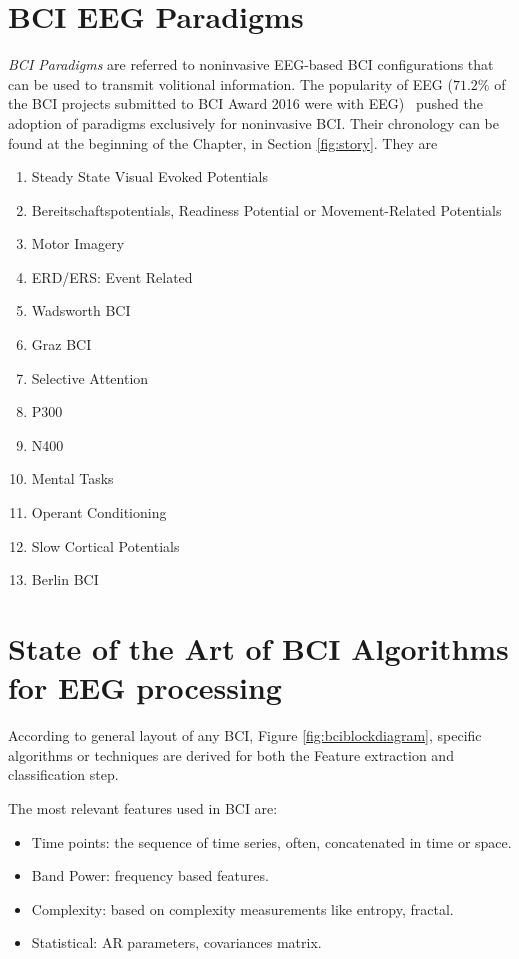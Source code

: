 \section{BCI EEG Paradigms}


\textit{BCI Paradigms} are referred to noninvasive EEG-based BCI configurations that can be used to transmit volitional information.  The popularity of EEG ($71.2\%$ of the BCI projects submitted to BCI Award 2016 were with EEG)~\cite{Guger2017} pushed the adoption of paradigms exclusively for noninvasive BCI.   Their chronology can be found at the beginning of the Chapter, in Section \ref{fig:story}. They are

\begin{enumerate}
\item Steady State Visual Evoked Potentials
\item Bereitschaftspotentials, Readiness Potential or Movement-Related Potentials
\item Motor Imagery
\item ERD/ERS: Event Related
\item Wadsworth BCI
\item Graz BCI
\item Selective Attention
\item P300
\item N400
\item Mental Tasks
\item Operant Conditioning
\item Slow Cortical Potentials
\item Berlin BCI


\end{enumerate}


\section{State of the Art of BCI Algorithms for EEG processing}

According to general layout of any BCI, Figure \ref{fig:bciblockdiagram}, specific algorithms or techniques are derived for both the Feature extraction and classification step.

The most relevant features used in BCI are:

\begin{itemize}
\item Time points:  the sequence of time series, often, concatenated in time or space.
\item Band Power: frequency based features.
\item Complexity:  based on complexity measurements like entropy, fractal.
\item Statistical: AR parameters, covariances matrix.
\end{itemize}


